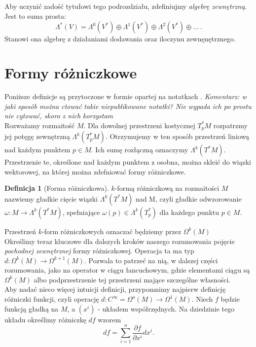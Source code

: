 \documentclass[licencjacka]{pracamgr}
\theoremstyle{definition}
\newtheorem{definition}{Definicja}[section]
\theoremstyle{definition}
\theoremstyle{plain}
\theoremstyle{plain}
\theoremstyle{plain}
\theoremstyle{plain}
\begin{document}
Aby uczynić zadość tytułowi tego podrozdziału, zdefiniujmy
\emph{algebrę zewnętrzną}. Jest to suma prosta:
\[
\Lambda^\ast (V) = 
\Lambda^0(V^\ast) \oplus
\Lambda^1(V^\ast) \oplus
\Lambda^2(V^\ast) \oplus
...~.
\] Stanowi ona algebrę z działaniami dodawania oraz iloczynu zewnęnętrznego. \\

\section{Formy różniczkowe}
Poniższe definicje są przytoczone w formie opartej na notatkach
\cite{duszenko}. 
\emph{Komentarz: w jaki sposób można ctować takie niepublikowane notatki? Nie 
wypada ich po prostu nie cytować, skoro z nich korzystam}
\\

Rozważamy rozmaitość $M$. Dla dowolnej przestrzeni kostycznej 
$T_p^\ast M$ rozpatrzmy jej potęgę zewnętrzną $\Lambda^k(T_p^\ast M)$.
Otrzymujemy w ten sposób przestrzeń liniową nad każdym punktem $p \in M$.
Ich sumę rozłączną oznaczymy $\Lambda^k(T^\ast M)$. Przestrzenie te,
określone nad każdym punktem z osobna, można skleić do wiązki wektorowej, na
której można zdefniować formy różniczkowe. \\

\begin{definition}[Forma różniczkowa]
  $k$-formą różniczkową na rozmaitości $M$ nazwiemy gładkie cięcie wiązki
  $\Lambda^k(T^\ast M)$ nad M, czyli gładkie odwzorowanie $\omega: M \rightarrow
  \Lambda^k (T^\ast M)$, spełniające $\omega(p) \in \Lambda^k(T_p^\ast)$ dla
  każdego punktu $p \in M$.
\end{definition}

Przestrzeń $k$-form różniczkowych oznaczać będziemy przez $\Omega^k(M)$ \\

Określimy teraz kluczowe dla dalszych kroków naszego rozumowania pojęcie
\emph{pochodnej zewnętrznej} formy różniczkowej. Operacja ta ma typ $d:
\Omega^k(M) \rightarrow \Omega^{k+1} (M)$. Pozwala to patrzeć na nią, w dalszej
części rozumowania, jako na operator w ciągu łancuchowym, gdzie elementami
ciągu są $\Omega^k(M)$ albo podprzestrzenie tej przestrzeni mające szczególne
własności. \\

Aby nadać nieco więcej intuicji definicji, przypomnimy najpierw
definicję różniczki funkcji, czyli operację 
$d: C^\infty = \Omega^o(M) \rightarrow \Omega^1(M)$. Niech $f$ będzie funkcją
gładką na $M$, a $(x^i)$ -  układem współrzędnych. Na dziedzinie tego układu
określimy różniczkę $df$ wzorem
\[
df = \sum_{i=1}^n \frac{\partial f}{\partial x^i} dx^i.
\] \\
\end{document}
